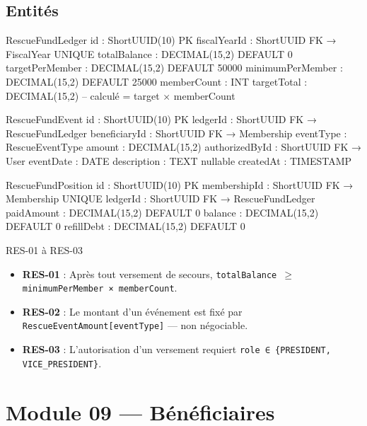 \documentclass[12pt, a4paper]{report}
\begin{document}
\subsection{Entités}

\begin{codeBox}
RescueFundLedger {
  id                : ShortUUID(10)  PK
  fiscalYearId      : ShortUUID      FK → FiscalYear  UNIQUE
  totalBalance      : DECIMAL(15,2)  DEFAULT 0
  targetPerMember   : DECIMAL(15,2)  DEFAULT 50000
  minimumPerMember  : DECIMAL(15,2)  DEFAULT 25000
  memberCount       : INT
  targetTotal       : DECIMAL(15,2)  -- calculé = target × memberCount
}

RescueFundEvent {
  id              : ShortUUID(10)  PK
  ledgerId        : ShortUUID      FK → RescueFundLedger
  beneficiaryId   : ShortUUID      FK → Membership
  eventType       : RescueEventType
  amount          : DECIMAL(15,2)
  authorizedById  : ShortUUID      FK → User
  eventDate       : DATE
  description     : TEXT           nullable
  createdAt       : TIMESTAMP
}

RescueFundPosition {
  id              : ShortUUID(10)  PK
  membershipId    : ShortUUID      FK → Membership  UNIQUE
  ledgerId        : ShortUUID      FK → RescueFundLedger
  paidAmount      : DECIMAL(15,2)  DEFAULT 0
  balance         : DECIMAL(15,2)  DEFAULT 0
  refillDebt      : DECIMAL(15,2)  DEFAULT 0
}
\end{codeBox}

\begin{invariantBox}{RES-01 à RES-03}
\begin{itemize}
  \item \textbf{RES-01} : Après tout versement de secours, \texttt{totalBalance $\geq$ minimumPerMember × memberCount}.
  \item \textbf{RES-02} : Le montant d'un événement est fixé par \texttt{RescueEventAmount[eventType]} — non négociable.
  \item \textbf{RES-03} : L'autorisation d'un versement requiert \texttt{role ∈ \{PRESIDENT, VICE\_PRESIDENT\}}.
\end{itemize}
\end{invariantBox}

\section{Module 09 — Bénéficiaires}
\end{document}
